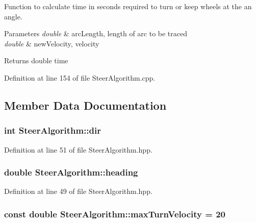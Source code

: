 Function to calculate time in seconds required to turn or keep wheels at the an angle. 


\begin{DoxyParams}{Parameters}
{\em double} & arc\+Length, length of arc to be traced \\
\hline
{\em double} & new\+Velocity, velocity \\
\hline
\end{DoxyParams}
\begin{DoxyReturn}{Returns}
double time 
\end{DoxyReturn}


Definition at line 154 of file Steer\+Algorithm.\+cpp.



\subsection{Member Data Documentation}
\subsubsection[{\texorpdfstring{dir}{dir}}]{\setlength{\rightskip}{0pt plus 5cm}int Steer\+Algorithm\+::dir}\hypertarget{class_steer_algorithm_af6ad5604b62eec22cc2d385c7683d019}{}\label{class_steer_algorithm_af6ad5604b62eec22cc2d385c7683d019}


Definition at line 51 of file Steer\+Algorithm.\+hpp.

\subsubsection[{\texorpdfstring{heading}{heading}}]{\setlength{\rightskip}{0pt plus 5cm}double Steer\+Algorithm\+::heading}\hypertarget{class_steer_algorithm_ada73b1f087245af5cda5d1d6b9be7d31}{}\label{class_steer_algorithm_ada73b1f087245af5cda5d1d6b9be7d31}


Definition at line 49 of file Steer\+Algorithm.\+hpp.

\subsubsection[{\texorpdfstring{max\+Turn\+Velocity}{maxTurnVelocity}}]{\setlength{\rightskip}{0pt plus 5cm}const double Steer\+Algorithm\+::max\+Turn\+Velocity = 20}\hypertarget{class_steer_algorithm_acfce52839329f0ebb316f633494466e1}{}\label{class_steer_algorithm_acfce52839329f0ebb316f633494466e1}


